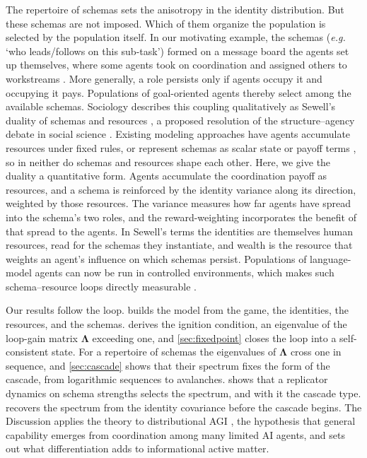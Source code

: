 \documentclass[
  aps,prx,
  reprint,
  superscriptaddress,
  nofootinbib,
  longbibliography
]{revtex4-2}
\newcommand{\Lam}{\bm{\Lambda}}
\begin{document}
The repertoire of schemas sets the anisotropy in the identity distribution. But these schemas are not imposed. Which of them organize the population is selected by the population itself. In our motivating example, the schemas (\textit{e.g.} `who leads/follows on this sub-task') formed on a message board the agents set up themselves, where some agents took on coordination and assigned others to workstreams \cite{openai2026incidentreport,metr2026incident}. More generally, a role persists only if agents occupy it and occupying it pays. Populations of goal-oriented agents thereby select among the available schemas. Sociology describes this coupling qualitatively as Sewell's duality of schemas and resources \cite{sewell1992}, a proposed resolution of the structure--agency debate in social science \cite{giddens1984}. Existing modeling approaches have agents accumulate resources under fixed rules, or represent schemas as scalar state or payoff terms \cite{tesfatsion2006,bouchaud2000,santos2006}, so in neither do schemas and resources shape each other. Here, we give the duality a quantitative form. Agents accumulate the coordination payoff as resources, and a schema is reinforced by the identity variance along its direction, weighted by those resources. The variance measures how far agents have spread into the schema's two roles, and the reward-weighting incorporates the benefit of that spread to the agents. In Sewell's terms the identities are themselves human resources, read for the schemas they instantiate, and wealth is the resource that weights an agent's influence on which schemas persist. Populations of language-model agents can now be run in controlled environments, which makes such schema--resource loops directly measurable \cite{touzel2026position}.

Our results follow the loop.  builds the model from the game, the identities, the resources, and the schemas.  derives the ignition condition, an eigenvalue of the loop-gain matrix $\Lam$ exceeding one, and \cref{sec:fixedpoint} closes the loop into a self-consistent state. For a repertoire of schemas the eigenvalues of $\Lam$ cross one in sequence, and \cref{sec:cascade} shows that their spectrum fixes the form of the cascade, from logarithmic sequences to avalanches.  shows that a replicator dynamics on schema strengths selects the spectrum, and with it the cascade type.  recovers the spectrum from the identity covariance before the cascade begins. The Discussion applies the theory to distributional AGI \cite{tomasev2026}, the hypothesis that general capability emerges from coordination among many limited AI agents, and sets out what differentiation adds to informational active matter.
\end{document}
